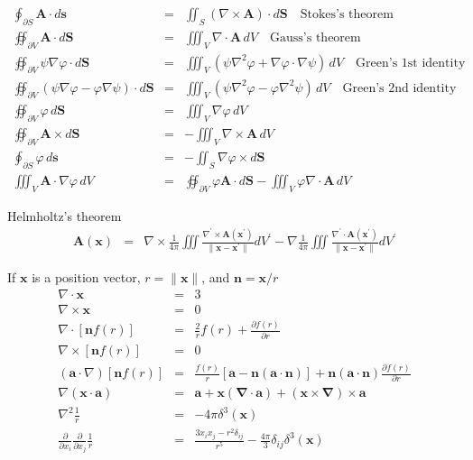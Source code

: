 \begin{eqnarray}
    \oint_{\partial S} \mathbf{A} \cdot d \mathbf{s} & = & \iint_S(\nabla \times \mathbf{A}) \cdot d \mathbf{S} \quad \text{Stokes's theorem} \\
    \oiint_{\partial V} \mathbf{A} \cdot d \mathbf{S} & = & \iiint_V \nabla \cdot \mathbf{A} \, dV \quad \text{Gauss's theorem} \\
    \oiint_{\partial V} \psi \nabla \varphi \cdot d \mathbf{S} & = & \iiint_V \left(\psi \nabla^2 \varphi + \nabla \varphi \cdot \nabla \psi\right) \, dV \quad \text{Green's 1st identity} \\
    \oiint_{\partial V} (\psi \nabla \varphi - \varphi \nabla \psi) \cdot d \mathbf{S} & = & \iiint_V \left(\psi \nabla^2 \varphi - \varphi \nabla^2 \psi\right) \, dV \quad \text{Green's 2nd identity} \\
    \oiint_{\partial V} \varphi \, d \mathbf{S} & = & \iiint_V \nabla \varphi \, dV \\
    \oiint_{\partial V} \mathbf{A} \times d \mathbf{S} & = & -\iiint_V \nabla \times \mathbf{A} \, dV \\
    \oint_{\partial S} \varphi \, d \mathbf{s} & = & -\iint_S \nabla \varphi \times d \mathbf{S} \\
    \iiint_V \mathbf{A} \cdot \nabla \varphi \, dV & = & \oiint_{\partial V} \varphi \mathbf{A} \cdot d \mathbf{S} - \iiint_V \varphi \nabla \cdot \mathbf{A} \, dV
\end{eqnarray}
    

Helmholtz's theorem
\begin{eqnarray}
\mathbf{A}(\mathbf{x}) & = & \nabla \times \frac{1}{4 \pi} \iiint \frac{\nabla^{\prime} \times \mathbf{A}(\mathbf{x}^{\prime})}{\|\mathbf{x} - \mathbf{x}^{\prime}\|} dV^{\prime} - \nabla \frac{1}{4 \pi} \iiint \frac{\nabla^{\prime} \cdot \mathbf{A}(\mathbf{x}^{\prime})}{\|\mathbf{x} - \mathbf{x}^{\prime}\|} dV^{\prime}
\end{eqnarray}

If $\mathbf{x}$ is a position vector, $r = \|\mathbf{x}\|$, and $\mathbf{n} = \mathbf{x} / r$
\begin{eqnarray}
\nabla \cdot \mathbf{x} & = & 3 \\
\nabla \times \mathbf{x} & = & 0 \\
\nabla \cdot [\mathbf{n} f(r)] & = & \frac{2}{r} f(r) + \frac{\partial f(r)}{\partial r} \\
\nabla \times [\mathbf{n} f(r)] & = & 0 \\
(\mathbf{a} \cdot \nabla)[\mathbf{n} f(r)] & = & \frac{f(r)}{r}[\mathbf{a} - \mathbf{n}(\mathbf{a} \cdot \mathbf{n})] + \mathbf{n}(\mathbf{a} \cdot \mathbf{n}) \frac{\partial f(r)}{\partial r} \\
\nabla(\mathbf{x} \cdot \mathbf{a}) & = & \mathbf{a} + \mathbf{x}(\boldsymbol{\nabla} \cdot \mathbf{a}) + (\mathbf{x} \times \boldsymbol{\nabla}) \times \mathbf{a} \\
\nabla^2 \frac{1}{r} & = & -4 \pi \delta^3(\mathbf{x}) \\
\frac{\partial}{\partial x_i} \frac{\partial}{\partial x_j} \frac{1}{r} & = & \frac{3 x_i x_j - r^2 \delta_{ij}}{r^5} - \frac{4 \pi}{3} \delta_{ij} \delta^3(\mathbf{x})
\end{eqnarray}


